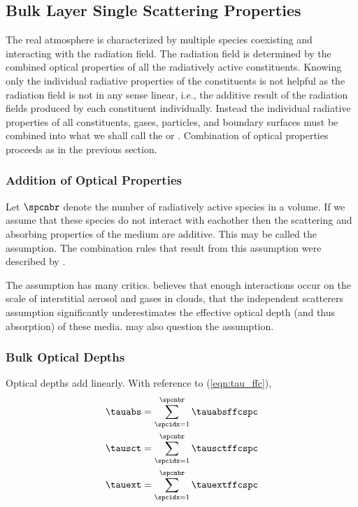 \documentclass[12pt]{article}
\begin{document}
\subsection{Bulk Layer Single Scattering Properties}\label{sxn:blk}
The real atmosphere is characterized by multiple species coexisting
and interacting with the radiation field. 
The radiation field is determined by the combined optical properties
of all the radiatively active constituents.
Knowing only the individual radiative properties of the constituents
is not helpful as the radiation field is not in any sense linear,
i.e., the additive result of the radiation fields produced by each
constituent individually.
Instead the individual radiative properties of all constituents,
gases, particles, and boundary surfaces must be combined into what we
shall call the  or
.
Combination of optical properties proceeds as in the previous section.

\subsubsection{Addition of Optical Properties}\label{sxn:opt_add}
Let $\spcnbr$ denote the number of radiatively active species in a
volume.
If we assume that these species do not interact with eachother then
the scattering and absorbing properties of the medium are additive.
This may be called the  assumption.
The combination rules that result from this assumption were described
by \cite{Ces85}.

The  assumption has many critics.
\cite{Mel08} believes that enough interactions occur on the scale of
interstitial aerosol and gases in clouds, that the independent
scatterers assumption significantly underestimates the effective
optical depth (and thus absorption) of these media.
\cite{KMW02} may also question the assumption.

\subsubsection[Bulk Optical Depths]{Bulk Optical Depths}\label{sxn:tau_blk}
Optical depths add linearly.
With reference to (\ref{eqn:tau_ffc}), 
\begin{subequations}
\label{eqn:tau_blk}
\begin{align}
\label{eqn:tau_abs_blk}
\tauabs & = \sum_{\spcidx = 1}^{\spcnbr} \tauabsffcspc \\
\label{eqn:tau_sct_blk}
\tausct & = \sum_{\spcidx = 1}^{\spcnbr} \tausctffcspc \\
\label{eqn:tau_ext_blk}
\tauext & = \sum_{\spcidx = 1}^{\spcnbr} \tauextffcspc
\end{align}
\end{subequations}
\end{document}
